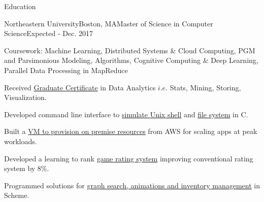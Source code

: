 \documentclass{resume} %
\begin{document}

\begin{rSection}{Education}

\begin{rSubsection}{Northeastern University}{Boston, MA}{Master of Science in Computer Science}{Expected - Dec. 2017}
\item Coursework: Machine Learning, Distributed Systems \& Cloud Computing, PGM and Parsimonious Modeling, Algorithms, Cognitive Computing \& Deep Learning, Parallel Data Processing in MapReduce
\item Received \href{http://www.northeastern.edu/data-analytics/data-science-certificate/}{Graduate Certificate} in Data Analytics $i.e.$ Stats, Mining, Storing, Visualization.
\item Developed command line interface to \href{https://github.com/singhay/ms-courses-code/tree/master/CS5600-Computer-Systems/team-05-hw1-master}{simulate Unix shell} and \href{https://github.com/singhay/ms-courses-code/tree/master/CS5600-Computer-Systems/team-05-hw2-master}{file system} in C.
\item Built a \href{https://github.com/singhay/ms-courses-code/tree/master/CS7680-Cloud-Computing-Distributed-Systems}{VM to provision on premise resources} from AWS for scaling apps at peak workloads.
\item Developed a learning to rank \href{https://github.com/singhay/ms-courses-code/tree/master/CS6140-Machine-Learning}{game rating system} improving conventional rating system by 8\%.
\item Programmed solutions for \href{https://github.com/singhay/ms-courses-code/tree/master/CS5010-Programming-Design-Paradigm}{graph search, animations and inventory management} in Scheme.
\end{rSubsection}


\end{rSection}
\end{document}
